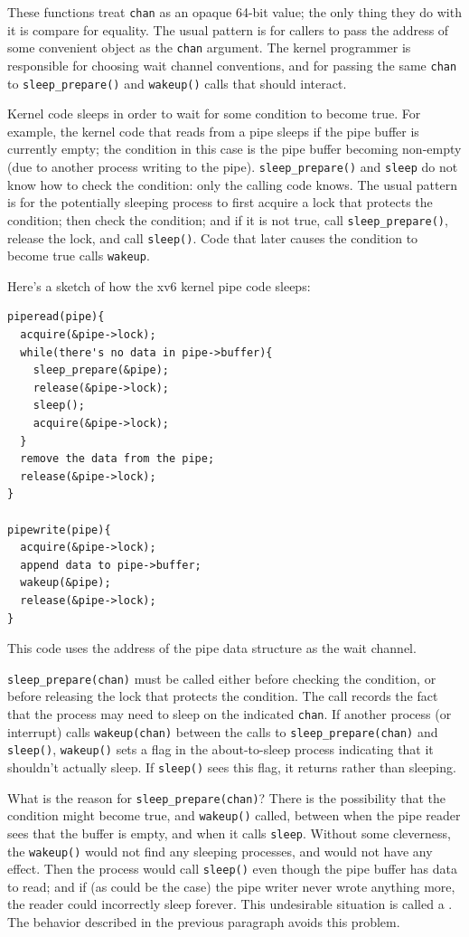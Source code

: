 These functions treat \lstinline{chan} as an opaque 64-bit value; the
only thing they do with it is compare for equality. The usual pattern
is for callers to pass the address of some convenient object as the
\lstinline{chan} argument. The kernel programmer is responsible for
choosing wait channel conventions, and for passing the same
\lstinline{chan} to \lstinline{sleep_prepare()} and
\lstinline{wakeup()} calls that should interact.

Kernel code sleeps in order to wait for some condition to become true.
For example, the kernel code that reads from a pipe sleeps
if the pipe buffer is currently empty; the condition
in this case is the pipe buffer becoming non-empty (due to another
process writing to the pipe). \lstinline{sleep_prepare()}
and \lstinline{sleep}
do not know how to check the condition: only the calling code knows. The
usual pattern is for the potentially sleeping process to
first acquire a lock that protects the condition;
then check the condition;
and if it is not true, call
\lstinline{sleep_prepare()},
release the lock,
and call \lstinline{sleep()}.
Code that later causes the
condition to become true calls \lstinline{wakeup}.

Here's a sketch of how the xv6 kernel pipe code sleeps:

\begin{lstlisting}
piperead(pipe){
  acquire(&pipe->lock);
  while(there's no data in pipe->buffer){
    sleep_prepare(&pipe);
    release(&pipe->lock);
    sleep();
    acquire(&pipe->lock);
  }
  remove the data from the pipe;
  release(&pipe->lock);
}

pipewrite(pipe){
  acquire(&pipe->lock);
  append data to pipe->buffer;
  wakeup(&pipe);
  release(&pipe->lock);
}
\end{lstlisting}

This code uses the address of the pipe data structure as
the wait channel.

\lstinline{sleep_prepare(chan)} must be called either before checking
the condition, or before releasing the lock that protects the
condition. The call records the fact that the process may need to
sleep on the indicated {\tt chan}. If another process (or interrupt)
calls \lstinline{wakeup(chan)} between the calls to
\lstinline{sleep_prepare(chan)} and \lstinline{sleep()},
\lstinline{wakeup()} sets a flag in the about-to-sleep process
indicating that it shouldn't actually sleep. If \lstinline{sleep()}
sees this flag, it returns rather than sleeping.

What is the reason for \lstinline{sleep_prepare(chan)}? There is the
possibility that the condition might become true, and
\lstinline{wakeup()} called, between when the pipe reader sees that
the buffer is empty, and when it calls \lstinline{sleep}. Without some
cleverness, the \lstinline{wakeup()} would not find any sleeping
processes, and would not have any effect. Then the process would call
\lstinline{sleep()} even though the pipe buffer has data to read; and
if (as could be the case) the pipe writer never wrote anything more,
the reader could incorrectly sleep forever. This undesirable situation
is called a . The behavior described in the
previous paragraph avoids this problem.

